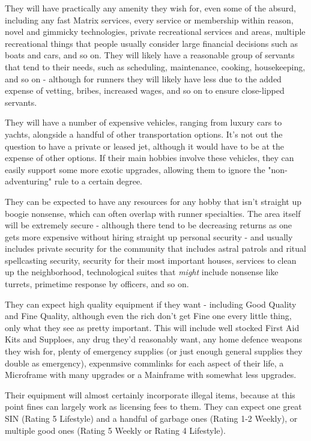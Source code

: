 \begin{multicols*}{2}
	They will have practically any amenity they wish for, even some of the absurd, including any fast Matrix services, every service or membership within reason, novel and gimmicky technologies, private recreational services and areas, multiple recreational things that people usually consider large financial decisions such as boats and cars, and so on. They will likely have a reasonable group of servants that tend to their needs, such as scheduling, maintenance, cooking, housekeeping, and so on - although for runners they will likely have less due to the added expense of vetting, bribes, increased wages, and so on to ensure close-lipped servants.
	
	They will have a number of expensive vehicles, ranging from luxury cars to yachts, alongside a handful of other transportation options. It's not out the question to have a private or leased jet, although it would have to be at the expense of other options. If their main hobbies involve these vehicles, they can easily support some more exotic upgrades, allowing them to ignore the "non-adventuring" rule to a certain degree.
	
	They can be expected to have any resources for any hobby that isn't straight up boogie nonsense, which can often overlap with runner specialties. The area itself will be extremely secure - although there tend to be decreasing returns as one gets more expensive without hiring straight up personal security - and usually includes private security for the community that includes astral patrols and ritual spellcasting security, security for their most important houses, services to clean up the neighborhood, technological suites that \textit{might} include nonsense like turrets, primetime response by officers, and so on.
	
	They can expect high quality equipment if they want - including Good Quality and Fine Quality, although even the rich don't get Fine one every little thing, only what they see as pretty important. This will include well stocked First Aid Kits and Supploes, any drug they'd reasonably want, any home defence weapons they wish for, plenty of emergency supplies (or just enough general supplies they double as emergency), expenmsive commlinks for each aspect of their life, a Microframe with many upgrades or a Mainframe with somewhat less upgrades. 
	
	Their equipment will almost certainly incorporate illegal items, because at this point fines can largely work as licensing fees to them. They can expect one great SIN (Rating 5 Lifestyle) and a handful of garbage ones (Rating 1-2 Weekly), or multiple good ones (Rating 5 Weekly or Rating 4 Lifestyle).
	

\end{multicols*}
